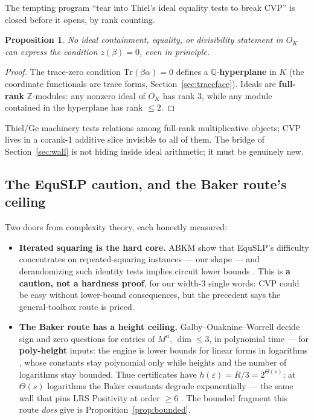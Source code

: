 \documentclass[11pt]{amsart}
\theoremstyle{plain}
\newtheorem{proposition}{Proposition}[section]
\theoremstyle{remark}
\begin{document}
The tempting program ``tear into Thiel's ideal equality tests to
break CVP'' is closed before it opens, by rank counting.

\begin{proposition}\label{prop:hyperplane}
No ideal containment, equality, or divisibility statement in $O_K$
can express the condition $z(\beta) = 0$, even in principle.
\end{proposition}

\begin{proof}
The trace-zero condition $\mathrm{Tr}(\beta\alpha) = 0$ defines a
$\mathbb{Q}$-\textbf{hyperplane} in $K$ (the coordinate functionals
are trace forms, Section~\ref{sec:traceface}). Ideals are
\textbf{full-rank} $\mathbb{Z}$-modules: any nonzero ideal of $O_K$
has rank 3, while any module contained in the hyperplane has rank
$\le 2$.
\end{proof}

Thiel/Ge machinery tests relations among full-rank multiplicative
objects; CVP lives in a corank-1 additive slice invisible to all of
them. The bridge of Section~\ref{sec:wall} is not hiding inside ideal
arithmetic; it must be genuinely new.

\subsection{The EquSLP caution, and the Baker route's ceiling}
\label{sec:equslp}

Two doors from complexity theory, each honestly measured:

\begin{itemize}
\item \textbf{Iterated squaring is the hard core.} ABKM
  \cite[Prop.~2.1]{ABKM09} show that EquSLP's difficulty concentrates
  on repeated-squaring instances --- our shape --- and derandomizing
  such identity tests implies circuit lower bounds \cite{KI04}. This
  is \textbf{a caution, not a hardness proof}, for our width-3 single
  words: CVP could be easy without lower-bound consequences, but the
  precedent says the general-toolbox route is priced.
\item \textbf{The Baker route has a height ceiling.}
  Galby--Ouaknine--Worrell \cite{GOW15} decide sign and zero
  questions for entries of $M^n$, $\dim \le 3$, in polynomial time
  --- for \textbf{poly-height} inputs: the engine is lower bounds for
  linear forms in logarithms \cite{Mat00}, whose constants stay
  polynomial only while heights and the number of logarithms stay
  bounded. Thue certificates have
  $h(\varepsilon) = R/3 = 2^{\Theta(s)}$; at $\Theta(s)$ logarithms
  the Baker constants degrade exponentially --- the same wall that
  pins LRS Positivity at order $\ge 6$ \cite{OW14}. The bounded
  fragment this route \emph{does} give is
  Proposition~\ref{prop:bounded}.
\end{itemize}
\end{document}
